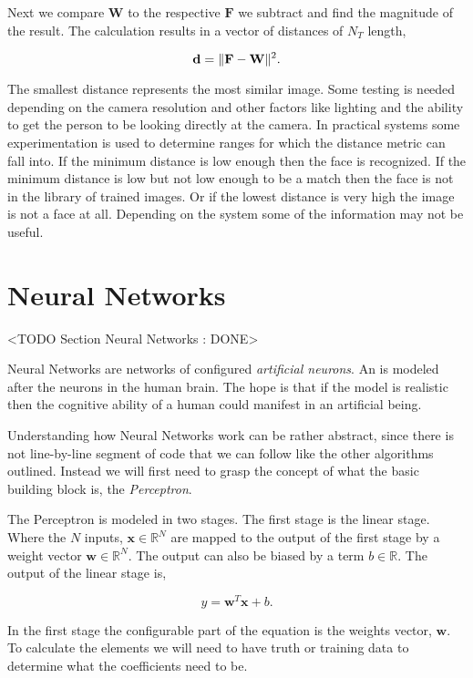 Next we compare $\mathbf{W}$ to the respective $\mathbf{F}$ we subtract and find the magnitude of the result. The calculation results in a vector of distances of $N_T$ length,

\begin{equation}
\mathbf{d} = \| \mathbf{F}-\mathbf{W} \|^2.
\end{equation}	

The smallest distance represents the most similar image. Some testing is needed depending on the camera resolution and other factors like lighting and the ability to get the person to be looking directly at the camera. In practical systems some experimentation is used to determine ranges for which the distance metric can fall into. If the minimum distance is low enough then the face is recognized. If the minimum distance is low but not low enough to be a match then the face is not in the library of trained images. Or if the lowest distance is very high the image is not a face at all. Depending on the system some of the information may not be useful. 
	
\section{Neural Networks}
	<TODO Section Neural Networks : DONE>

Neural Networks are networks of configured \emph{artificial neurons}. An  is modeled after the neurons in the human brain. The hope is that if the model is realistic then the cognitive ability of a human could manifest in an artificial being. 

Understanding how Neural Networks work can be rather abstract, since there is not line-by-line segment of code that we can follow like the other algorithms outlined. Instead we will first need to grasp the concept of what the basic building block is, the \emph{Perceptron}. 

The Perceptron is modeled in two stages. The first stage is the linear stage. Where the $N$ inputs, $\mathbf{x}\in \mathbb{R}^N$ are mapped to the output of the first stage by a weight vector $\mathbf{w}\in \mathbb{R}^{N}$. The output can also be biased by a term $b\in \mathbb{R}$. The output of the linear stage is,

\begin{equation}
y = \mathbf{w}^T\mathbf{x} + b.
\end{equation} 

In the first stage the configurable part of the equation is the weights vector, $\mathbf{w}$. To calculate the elements we will need to have truth or training data to determine what the coefficients need to be.

